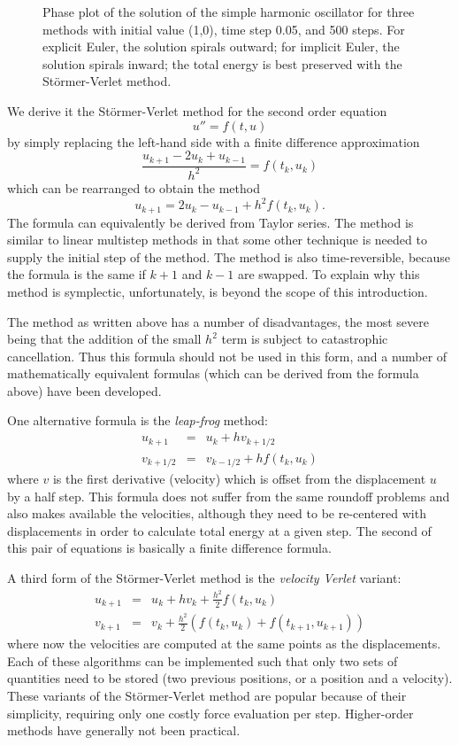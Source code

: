\begin{figure}[htbp]
\begin{center}
{}
\caption{Phase plot of the solution of the simple harmonic oscillator for
three methods with initial value (1,0), time step 0.05, and 500 steps.  
For explicit Euler, the solution
spirals outward; for implicit Euler, the solution spirals inward; 
the total energy is best preserved with the St\"{o}rmer-Verlet method.}
\label{fig:integ}
\end{center}
\end{figure}

We derive it 
the St\"{o}rmer-Verlet method for the second order
equation
\[
u'' = f(t, u)
\]
by simply replacing the left-hand side with a finite difference approximation
\[
\frac{u_{k+1} - 2 u_k + u_{k-1}}{h^2} = f(t_k, u_k)
\]
which can be rearranged to obtain the method
\[
u_{k+1} = 2 u_k - u_{k-1} + h^2 f(t_k, u_k) .
\]
The formula can equivalently be derived from Taylor series.
The method is similar to linear multistep methods in that
some other technique is needed to supply the initial step of the method.  
The method is also time-reversible, because the formula is the same
if $k+1$ and $k-1$ are swapped.
To explain why this method is symplectic, 
unfortunately, is beyond the scope of this introduction.

The method as written above has a number of disadvantages, the most severe being
that the addition of the small $h^2$ term is subject to catastrophic cancellation.
Thus this formula should not be used in this form, and a number of mathematically
equivalent formulas (which can be derived from the formula above) have been developed.

One alternative formula is the {\em leap-frog} method:
\begin{eqnarray*}
u_{k+1} & = & u_k + h v_{k+1/2} \\
v_{k+1/2} & = & v_{k-1/2} + h f(t_k, u_k)
\end{eqnarray*}
where $v$ is the first derivative (velocity) which is offset from
the displacement $u$ by a half step.  This formula does not 
suffer from the same roundoff problems and also makes available the velocities,
although they need to be re-centered with displacements in order to calculate
total energy at a given step.
The second of this pair of equations is basically a finite difference formula.

A third form of the St\"{o}rmer-Verlet method is the {\em velocity Verlet}
variant:
\begin{eqnarray*}
u_{k+1} & = & u_k + h v_k + \frac{h^2}{2} f(t_k, u_k) \\
v_{k+1} & = & v_k + \frac{h^2}{2} (f(t_k, u_k) + f(t_{k+1}, u_{k+1}))
\end{eqnarray*}
where now the velocities are computed at the same points as the 
displacements.  Each of these algorithms can be implemented such
that only two sets of quantities need to be stored (two previous positions,
or a position and a velocity).
These variants of the St\"{o}rmer-Verlet method are popular because of
their simplicity, requiring only one costly force evaluation per step.
Higher-order methods have generally not been practical.


